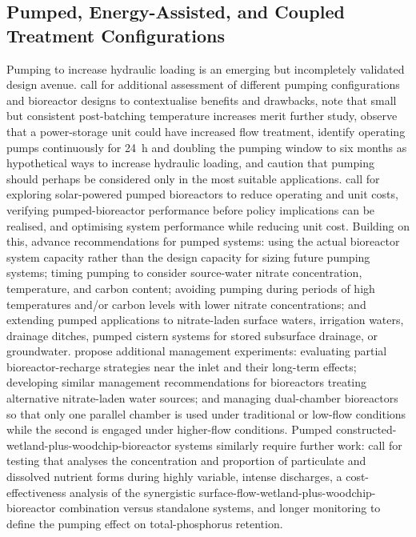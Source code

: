 \documentclass[11pt]{article}
\begin{document}
\subsection{Pumped, Energy-Assisted, and Coupled Treatment Configurations}
Pumping to increase hydraulic loading is an emerging but incompletely validated design avenue. \textcite{DíazGarcía2025} call for additional assessment of different pumping configurations and bioreactor designs to contextualise benefits and drawbacks, note that small but consistent post-batching temperature increases merit further study, observe that a power-storage unit could have increased flow treatment, identify operating pumps continuously for 24~h and doubling the pumping window to six months as hypothetical ways to increase hydraulic loading, and caution that pumping should perhaps be considered only in the most suitable applications. \textcite{Hartfiel2024} call for exploring solar-powered pumped bioreactors to reduce operating and unit costs, verifying pumped-bioreactor performance before policy implications can be realised, and optimising system performance while reducing unit cost. Building on this, \textcite{Hartfiel2023} advance recommendations for pumped systems: using the actual bioreactor system capacity rather than the design capacity for sizing future pumping systems; timing pumping to consider source-water nitrate concentration, temperature, and carbon content; avoiding pumping during periods of high temperatures and/or carbon levels with lower nitrate concentrations; and extending pumped applications to nitrate-laden surface waters, irrigation waters, drainage ditches, pumped cistern systems for stored subsurface drainage, or groundwater. \textcite{Hartfiel2023b} propose additional management experiments: evaluating partial bioreactor-recharge strategies near the inlet and their long-term effects; developing similar management recommendations for bioreactors treating alternative nitrate-laden water sources; and managing dual-chamber bioreactors so that only one parallel chamber is used under traditional or low-flow conditions while the second is engaged under higher-flow conditions. Pumped constructed-wetland-plus-woodchip-bioreactor systems similarly require further work: \textcite{Pugliese2020} call for testing that analyses the concentration and proportion of particulate and dissolved nutrient forms during highly variable, intense discharges, a cost-effectiveness analysis of the synergistic surface-flow-wetland-plus-woodchip-bioreactor combination versus standalone systems, and longer monitoring to define the pumping effect on total-phosphorus retention.
\end{document}
